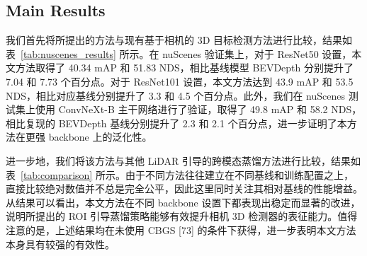 \documentclass[12pt, UTF8]{ctexart}
\begin{document}
\subsection{Main Results}
我们首先将所提出的方法与现有基于相机的 3D 目标检测方法进行比较，结果如表~\ref{tab:nuscenes_results} 所示。在 nuScenes 验证集上，对于 ResNet50 设置，本文方法取得了 40.34 mAP 和 51.83 NDS，相比基线模型 BEVDepth 分别提升了 7.04 和 7.73 个百分点。对于 ResNet101 设置，本文方法达到 43.9 mAP 和 53.5 NDS，相比对应基线分别提升了 3.3 和 4.5 个百分点。此外，我们在 nuScenes 测试集上使用 ConvNeXt-B 主干网络进行了验证，取得了 49.8 mAP 和 58.2 NDS，相比复现的 BEVDepth 基线分别提升了 2.3 和 2.1 个百分点，进一步证明了本方法在更强 backbone 上的泛化性。

进一步地，我们将该方法与其他 LiDAR 引导的跨模态蒸馏方法进行比较，结果如表~\ref{tab:comparison} 所示。由于不同方法往往建立在不同基线和训练配置之上，直接比较绝对数值并不总是完全公平，因此这里同时关注其相对基线的性能增益。从结果可以看出，本文方法在不同 backbone 设置下都表现出稳定而显著的改进，说明所提出的 ROI 引导蒸馏策略能够有效提升相机 3D 检测器的表征能力。值得注意的是，上述结果均在未使用 CBGS [73] 的条件下获得，进一步表明本文方法本身具有较强的有效性。
\end{document}

